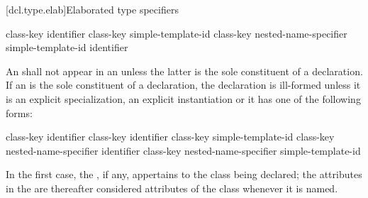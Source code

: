 [dcl.type.elab]{Elaborated type specifiers}%
%
%

\begin{bnf}
\br
    class-key   identifier\br
    class-key simple-template-id\br
    class-key nested-name-specifier  simple-template-id\br
      identifier
\end{bnf}

\pnum
{}%
%
An  shall not appear in an 
unless the latter is the sole constituent of a declaration.
If an  is the sole constituent of a
declaration, the declaration is ill-formed unless it is an explicit
specialization, an explicit
instantiation or it has one of the following
forms:

\begin{ncsimplebnf}
class-key  identifier \terminal{;}\br
{} class-key \terminal{\opt{::}} identifier \terminal{;}\br
{} class-key \terminal{\opt{::}} simple-template-id \terminal{;}\br
{} class-key nested-name-specifier identifier \terminal{;}\br
{} class-key nested-name-specifier  simple-template-id \terminal{;}
\end{ncsimplebnf}

In the first case, the , if any, appertains
to the class being declared; the attributes in the
 are thereafter considered attributes of
the class whenever it is named.


